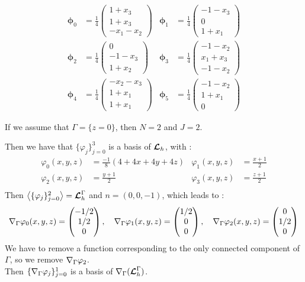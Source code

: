 \begin{align*}
\bm{\phi}_0 &= \frac{1}{4}\begin{pmatrix}1+x_3\\1+x_3\\-x_1-x_2\end{pmatrix} &
\bm{\phi}_1 &= \frac{1}{4}\begin{pmatrix}-1-x_3\\0\\1+x_1\end{pmatrix} \\
\bm{\phi}_2 &= \frac{1}{4}\begin{pmatrix}0\\-1-x_3\\1+x_2\end{pmatrix} &
\bm{\phi}_3 &= \frac{1}{4}\begin{pmatrix}-1-x_2\\x_1+x_3\\-1-x_2\end{pmatrix}\\
\bm{\phi}_4 &= \frac{1}{4}\begin{pmatrix}-x_2-x_3\\1+x_1\\1+x_1\end{pmatrix} &
\bm{\phi}_5 &= \frac{1}{4}\begin{pmatrix}-1-x_2\\1+x_1\\0\end{pmatrix}
\end{align*}

If we assume that $\Gamma=\{z=0\}$, then $N=2$ and $J=2$.

Then we have that $\{\varphi_j\}_{j=0}^3$ is a basis of ${\bm{\mathcal{L}}}_h$, with :
\begin{align*}
\varphi_0(x,y,z) &= \frac{-1}{8}(4+4x+4y+4z) &
\varphi_1(x,y,z) &= \frac{x+1}{2}\\
\varphi_2(x,y,z) &= \frac{y+1}{2} & \varphi_3(x,y,z) &= \frac{z+1}{2}\\
\end{align*}
Then $\left\langle\{\varphi_j\}_{j=0}^2\right\rangle={\bm{\mathcal{L}}}_h^\Gamma$ and
$n=(0,0,-1)$, which leads to :
\[
{\nabla}_\Gamma \varphi_0(x,y,z) = \begin{pmatrix}-1/2\\1/2\\0\end{pmatrix},\quad
{\nabla}_\Gamma \varphi_1(x,y,z) = \begin{pmatrix}1/2\\0\\0\end{pmatrix},\quad
{\nabla}_\Gamma \varphi_2(x,y,z) = \begin{pmatrix}0\\1/2\\0\end{pmatrix}
\]
We have to remove a function corresponding to the only connected component of
$\Gamma$, so we remove ${\nabla}_\Gamma \varphi_2$.\\
Then $\{{\nabla}_\Gamma \varphi_j\}_{j=0}^1$ is a basis of
${\nabla}_\Gamma({\bm{\mathcal{L}}}_h^\Gamma)$.\\


